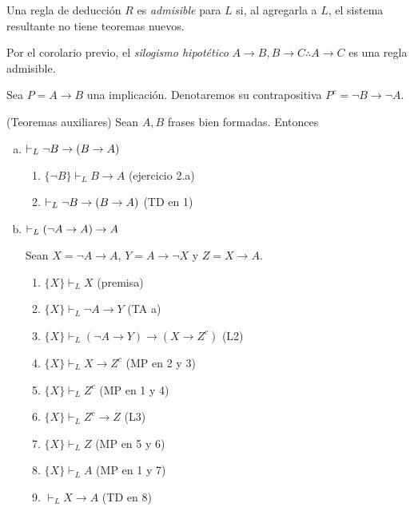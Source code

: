 \begin{definition}
Una regla de deducción $R$ es \textit{admisible} para $L$ si, al agregarla a $L$, el sistema resultante no tiene teoremas nuevos.
\end{definition}

\begin{example}
Por el corolario previo, el \textit{silogismo hipotético} $A \to B, B \to C \therefore A \to C$ es una regla admisible.
\end{example}

\begin{notation}
Sea $P = A \to B$ una implicación. Denotaremos su contrapositiva $P^c = \neg B \to \neg A$.
\end{notation}

\begin{proposition}
(Teoremas auxiliares) Sean $A,B$ frases bien formadas. Entonces
\end{proposition}

\begin{enumerate}[(a)]
    \item $\vdash_L \neg B \to (B \to A)$
    \begin{prove}
    \leavevmode
    \begin{enumerate}[1.]
        \item $\{ \neg B \} \vdash_L B \to A$ \hfill (ejercicio 2.a)
        \item $\vdash_L \neg B \to (B \to A)$               \hfill (TD en 1)
    \end{enumerate}
    \end{prove}
    
    \item $\vdash_L (\neg A \to A) \to A$
    \begin{prove}
    Sean $X = \neg A \to A$, $Y = A \to \neg X$ y $Z = X \to A$.
    \begin{enumerate}[1.]
        \item $\{ X \} \vdash_L X$                              \hfill (premisa)
        \item $\{ X \} \vdash_L \neg A \to Y$                   \hfill (TA a)
        \item $\{ X \} \vdash_L (\neg A \to Y) \to (X \to Z^c)$ \hfill (L2)
        \item $\{ X \} \vdash_L X \to Z^c$                      \hfill (MP en 2 y 3)
        \item $\{ X \} \vdash_L Z^c$                            \hfill (MP en 1 y 4)
        \item $\{ X \} \vdash_L Z^c \to Z$                      \hfill (L3)
        \item $\{ X \} \vdash_L Z$                              \hfill (MP en 5 y 6)
        \item $\{ X \} \vdash_L A$                              \hfill (MP en 1 y 7)
        \item $\vdash_L X \to A$                                \hfill (TD en 8)
    \end{enumerate}
    \end{prove}
\end{enumerate}

